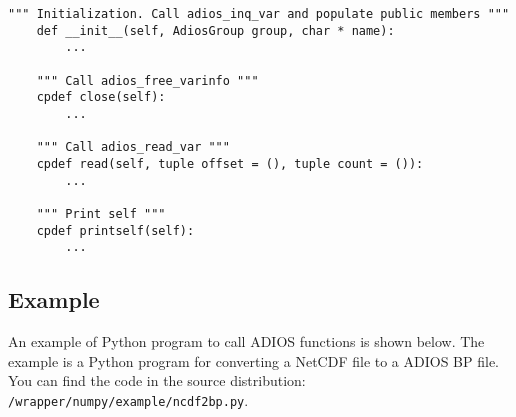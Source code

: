 \begin{lstlisting}[language=cython,caption={Write functions},label={},]
    """ Initialization. Call adios_inq_var and populate public members """
    def __init__(self, AdiosGroup group, char * name):
        ...
        
    """ Call adios_free_varinfo """
    cpdef close(self):
        ...
        
    """ Call adios_read_var """
    cpdef read(self, tuple offset = (), tuple count = ()):
        ...

    """ Print self """
    cpdef printself(self):
        ...

\end{lstlisting}

\subsection{Example}
An example of Python program to call ADIOS functions is shown below. The example is a Python program for converting a NetCDF file to a ADIOS BP file. You can find the code in the source distribution: \verb+/wrapper/numpy/example/ncdf2bp.py+.

